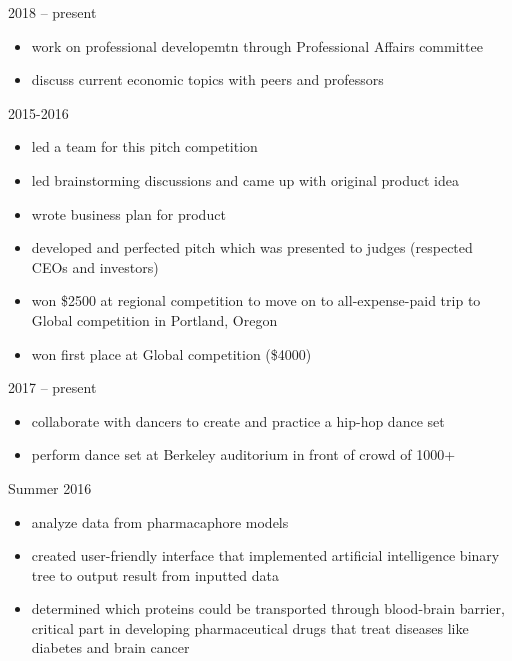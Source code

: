 



 {2018 -- present}
\begin{itemize}
\item work on professional developemtn through Professional Affairs committee
\item discuss current economic topics with peers and professors
\end{itemize}
\smallskip
{} {2015-2016}
\begin{itemize}
\item  led a team for this pitch competition
\item led brainstorming discussions and came up with original product idea
\item wrote business plan for product
\item developed and perfected pitch which was presented to judges (respected CEOs and investors)
\item won \$2500 at regional competition to move on to all-expense-paid trip to Global competition in Portland, Oregon
\item won first place at Global competition (\$4000)
\end{itemize}
\smallskip

 {2017 -- present}
\begin{itemize}
\item collaborate with dancers to create and practice a hip-hop dance set
\item perform dance set at Berkeley auditorium in front of crowd of 1000+

\end{itemize}
\smallskip
{} {Summer 2016}
\begin{itemize}
\item analyze data from pharmacaphore models
\item created user-friendly interface that implemented artificial intelligence binary tree to output result from inputted data
\item determined which proteins could be transported through blood-brain barrier, critical part in developing pharmaceutical drugs that treat diseases like diabetes and brain cancer
\end{itemize}
\smallskip

\cvproject{}
